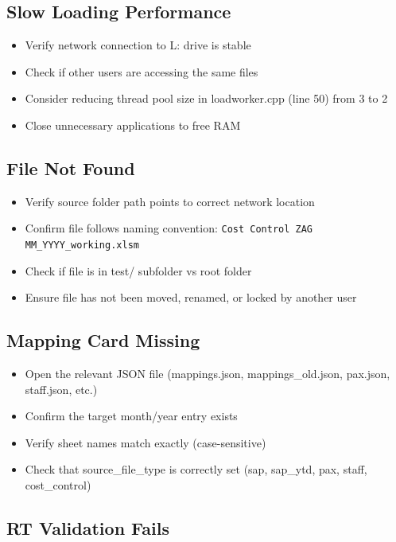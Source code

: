 \documentclass[11pt,a4paper]{article}
\begin{document}
\subsection{Slow Loading Performance}

\begin{itemize}[leftmargin=*, itemsep=4pt]
\item Verify network connection to L: drive is stable
\item Check if other users are accessing the same files
\item Consider reducing thread pool size in loadworker.cpp (line 50) from 3 to 2
\item Close unnecessary applications to free RAM
\end{itemize}

\subsection{File Not Found}

\begin{itemize}[leftmargin=*, itemsep=4pt]
\item Verify source folder path points to correct network location
\item Confirm file follows naming convention: \texttt{Cost Control ZAG MM\_YYYY\_working.xlsm}
\item Check if file is in test/ subfolder vs root folder
\item Ensure file has not been moved, renamed, or locked by another user
\end{itemize}

\subsection{Mapping Card Missing}

\begin{itemize}[leftmargin=*, itemsep=4pt]
\item Open the relevant JSON file (mappings.json, mappings\_old.json, pax.json, staff.json, etc.)
\item Confirm the target month/year entry exists
\item Verify sheet names match exactly (case-sensitive)
\item Check that source\_file\_type is correctly set (sap, sap\_ytd, pax, staff, cost\_control)
\end{itemize}

\subsection{RT Validation Fails}
\end{document}
